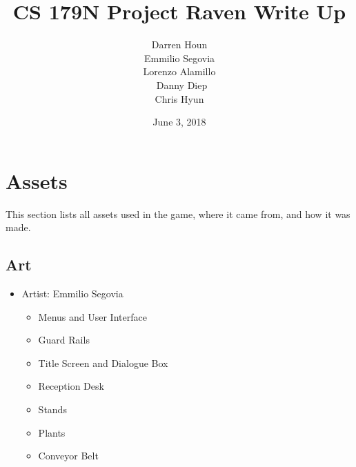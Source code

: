 \documentclass[a4paper]{article}
\title{CS 179N Project Raven Write Up}
\author{Darren Houn  \\ Emmilio Segovia \\ Lorenzo Alamillo \\\ Danny Diep \\ Chris Hyun}
\date{June 3, 2018}
\begin{document}
\maketitle

\section{Assets}
This section lists all assets used in the game, where it came from, and how it was made.
\subsection{Art}
\begin{itemize}
\item Artist: Emmilio Segovia
\begin{itemize}
\item Menus and User Interface
\item Guard Rails
\item Title Screen and Dialogue Box
\item Reception Desk
\item Stands
\item Plants
\item Conveyor Belt
\end{itemize}


\end{itemize}
\end{document}
